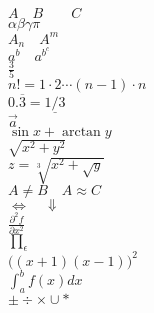 \documentclass{article}
\begin{document}
$A\quad B\qquad C$\\
$ \alpha \beta \gamma \pi$\\
$A_n \quad A^m$\\
$a^b \quad a^{b^c}$\\
$\frac{3}{5}$\\
$n! = 1 \cdot 2 \cdots (n-1) \cdot n$\\
$0.\overline{3} = \underline{1/3}$\\
$\vec{a}$\\
$\sin x + \arctan y$\\
$\sqrt{x^2+y^2}$\\
$z=\sqrt[3]{x^{2} + \sqrt{y}}$\\
$A \neq B \quad A \approx C \quad $\\
$\Leftrightarrow\quad\Downarrow$\\
$\frac{\partial ^2f}{\partial x^2}$\\
$\prod_\epsilon$\\
$\Big((x+1)(x-1)\Big)^{2}$\\
$\int_a^b f(x) dx$\\
$\pm \div \times \cup \ast $
\end{document}
